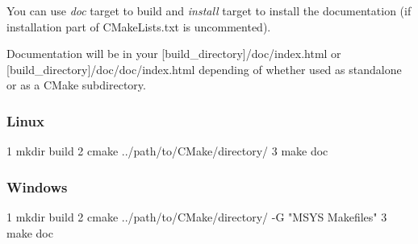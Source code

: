 You can use {\itshape doc} target to build and {\itshape install} target to install the documentation (if installation part of C\+Make\+Lists.\+txt is uncommented).

Documentation will be in your {\ttfamily \mbox{[}build\+\_\+directory\mbox{]}/doc/index.html} or {\ttfamily \mbox{[}build\+\_\+directory\mbox{]}/doc/doc/index.html} depending of whether used as standalone or as a C\+Make subdirectory.

\subsubsection*{Linux}


\begin{DoxyCode}
1 mkdir build
2 cmake ../path/to/CMake/directory/
3 make doc
\end{DoxyCode}


\subsubsection*{Windows}


\begin{DoxyCode}
1 mkdir build
2 cmake ../path/to/CMake/directory/ -G "MSYS Makefiles"
3 make doc
\end{DoxyCode}
 